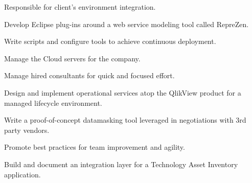 \documentclass[letterpaper]{deedy-resume} %
\begin{document}
\begin{minipage}[t]{0.66\textwidth}

\begin{tightitemize}
\item Responsible for client's environment integration.
\item Develop Eclipse plug-ins around a web service modeling tool called RepreZen.
\item Write scripts and configure tools to achieve continuous deployment.
\item Manage the Cloud servers for the company.
\item Manage hired consultants for quick and focused effort.
\end{tightitemize}

\sectionspace %



\begin{tightitemize}
\item Design and implement operational services atop the QlikView product for a managed lifecycle environment.
\item Write a proof-of-concept datamasking tool leveraged in negotiations with 3rd party vendors.
\item Promote best practices for team improvement and agility.
\item Build and document an integration layer for a Technology Asset Inventory application. 
\end{tightitemize}

\sectionspace %




\sectionspace %





\end{minipage}
\end{document}
